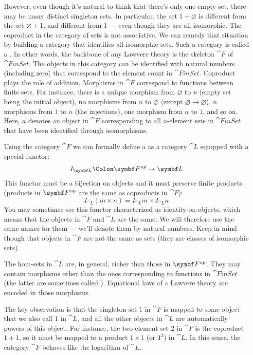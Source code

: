 However, even though it's natural to think that there's only one empty
set, there may be many distinct singleton sets. In particular, the set
$1 + \varnothing$ is different from the set $\varnothing + 1$, and
different from $1$ --- even though they are all isomorphic. The
coproduct in the category of sets is not associative. We can remedy that
situation by building a category that identifies all isomorphic sets.
Such a category is called a . In other words, the
backbone of any Lawvere theory is the skeleton $\cat{F}$ of
$\cat{FinSet}$. The objects in this category can be identified with
natural numbers (including zero) that correspond to the element count in
$\cat{FinSet}$. Coproduct plays the role of addition. Morphisms in
$\cat{F}$ correspond to functions between finite sets. For instance,
there is a unique morphism from $\varnothing$ to $n$ (empty set
being the initial object), no morphisms from $n$ to $\varnothing$
(except $\varnothing \to \varnothing$), $n$ morphisms from $1$ to
$n$ (the injections), one morphism from $n$ to $1$,
and so on. Here, $n$ denotes an object in $\cat{F}$
corresponding to all $n$-element sets in $\cat{FinSet}$ that have been
identified through isomorphisms.

Using the category $\cat{F}$ we can formally define a  as a category $\cat{L}$ equipped with a special functor:
\[I_{\cat{L}} \Colon \Fop \to \cat{L}\]
This functor must be a bijection on objects and it must preserve finite
products (products in $\Fop$ are the same as
coproducts in $\cat{F}$):
\[I_{\cat{L}} (m\times{}n) = I_{\cat{L}} m\times{}I_{\cat{L}} n\]
You may sometimes see this functor characterized as identity-on-objects,
which means that the objects in $\cat{F}$ and $\cat{L}$ are the same.
We will therefore use the same names for them --- we'll denote them by
natural numbers. Keep in mind though that objects in $\cat{F}$ are not
the same as sets (they are classes of isomorphic sets).

The hom-sets in $\cat{L}$ are, in general, richer than those in
$\Fop$. They may contain morphisms other than
the ones corresponding to functions in $\cat{FinSet}$ (the latter are
sometimes called ). Equational laws of a
Lawvere theory are encoded in those morphisms.

The key observation is that the singleton set $1$ in $\cat{F}$
is mapped to some object that we also call $1$ in $\cat{L}$, and
all the other objects in $\cat{L}$ are automatically powers of this
object. For instance, the two-element set $2$ in $\cat{F}$ is
the coproduct $1 + 1$, so it must be mapped to a product
$1 \times 1$ (or $1^2$) in $\cat{L}$. In this sense, the category
$\cat{F}$ behaves like the logarithm of $\cat{L}$.


